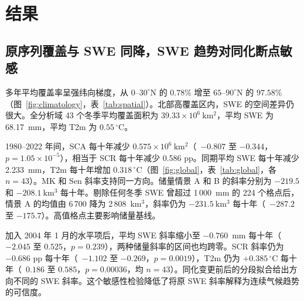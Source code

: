 \section{结果}

\subsection{原序列覆盖与 SWE 同降，SWE 趋势对同化断点敏感}

多年平均覆盖率呈强纬向梯度，从 $0$--$30^\circ$N 的 $0.78\%$ 增至 $65$--$90^\circ$N 的 $97.58\%$（图~\ref{fig:climatology}，表~\ref{tab:spatial}）。北部高覆盖区内，SWE 的空间差异仍很大。全分析域 43 个冬季平均覆盖面积为 $39.33\times10^6~\mathrm{km^2}$，平均 SWE 为 68.17~mm，平均 T2m 为 $0.55\,^\circ$C。


1980--2022 年间，SCA 每十年减少 $0.575\times10^6~\mathrm{km^2}$（\CI\ $-0.807$ 至 $-0.344$，$p=1.05\times10^{-5}$），相当于 SCR 每十年减少 0.586 pp。同期平均 SWE 每十年减少 2.233~mm，T2m 每十年增加 $0.318\,^\circ$C（图~\ref{fig:global}，表~\ref{tab:global}，各 $n=43$）。MK 和 Sen 斜率支持同一方向。储量情景 A 和 B 的斜率分别为 $-219.5$ 和 $-208.1~\mathrm{km^3}$ 每十年。剔除任何冬季 SWE 曾超过 1\,000~mm 的 224 个格点后，情景 A 的均值由 6\,700 降为 2\,808~km$^3$，斜率仍为 $-231.5~\mathrm{km^3}$ 每十年（\CI\ $-287.2$ 至 $-175.7$）。高值格点主要影响储量基线。

\begin{table}[!htbp]\centering\small
\caption{\textbf{全分析域冬季指标的线性趋势。} 1980--2022 年，$n=43$ 个 DJF 冬季。各斜率以每十年计。区间和双侧 $p$ 值采用 HAC(3)，$n_{\rm eff}$ 为基于一阶残差自相关的描述性近似。}\label{tab:global}

\end{table}


加入 2004 年 1 月的水平项后，平均 SWE 斜率缩小至 $-0.760$~mm 每十年（\CI\ $-2.045$ 至 $0.525$，$p=0.239$），两种储量斜率的区间也均跨零。SCR 斜率仍为 $-0.686$ pp 每十年（\CI\ $-1.102$ 至 $-0.269$，$p=0.0019$），T2m 仍为 $+0.385\,^\circ$C 每十年（\CI\ $0.186$ 至 $0.585$，$p=0.00036$，均 $n=43$）。同化变更前后的分段拟合给出方向不同的 SWE 斜率。这个敏感性检验降低了将原 SWE 斜率解释为连续气候趋势的可信度。

